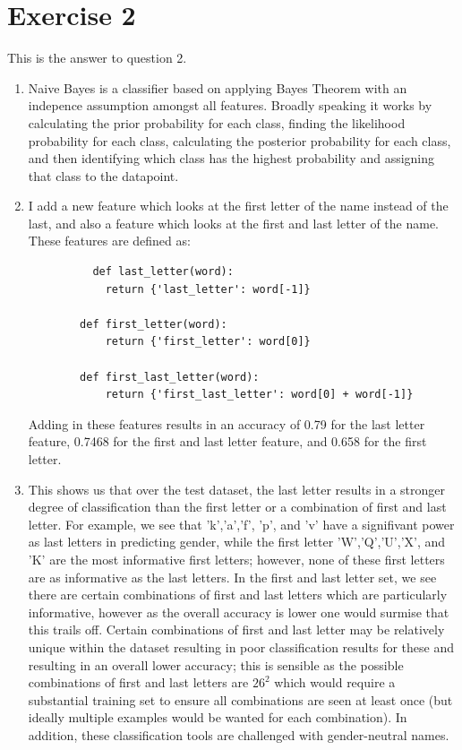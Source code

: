 \documentclass{article}
\begin{document}
\section{Exercise 2}
This is the answer to question 2.
\begin{enumerate}
	
	\item Naive Bayes is a classifier based on applying Bayes Theorem with an indepence assumption amongst all features. Broadly speaking it works by calculating the prior probability for each class, finding the likelihood probability for each class, calculating the posterior probability for each class, and then identifying which class has the highest probability and assigning that class to the datapoint. 
	
	\item I add a new feature which looks at the first letter of the name instead of the last, and also a feature which looks at the first and last letter of the name. These features are defined as:
	\begin{verbatim}
		  def last_letter(word):
			return {'last_letter': word[-1]}
		
		def first_letter(word):
			return {'first_letter': word[0]}
		
		def first_last_letter(word):
			return {'first_last_letter': word[0] + word[-1]}
	\end{verbatim}
\noindent Adding in these features results in an accuracy of 0.79 for the last letter feature, 0.7468 for the first and last letter feature, and 0.658 for the first letter. 
\item This shows us that over the test dataset, the last letter results in a stronger degree of classification than the first letter or a combination of first and last letter. For example, we see that 'k','a','f', 'p', and 'v' have a signifivant power as last letters in predicting gender, while the first letter 'W','Q','U','X', and 'K' are the most informative first letters; however, none of these first letters are as informative as the last letters. In the first and last letter set, we see there are certain combinations of first and last letters which are particularly informative, however as the overall accuracy is lower one would surmise that this trails off. Certain combinations of first and last letter may be relatively unique within the dataset resulting in poor classification results for these and resulting in an overall lower accuracy; this is sensible as the possible combinations of first and last letters are $26^2$ which would require a substantial training set to ensure all combinations are seen at least once (but ideally multiple examples would be wanted for each combination). In addition, these classification tools are challenged with gender-neutral names.


\end{enumerate}
\end{document}
